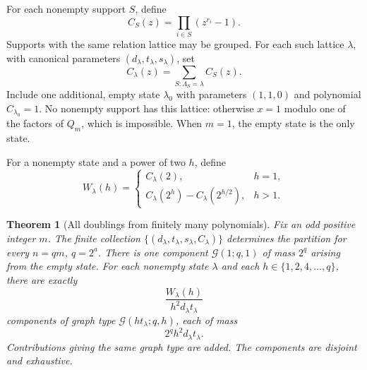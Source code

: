 \documentclass[11pt]{article}
\newtheorem{theorem}{Theorem}[section]
\theoremstyle{definition}
\theoremstyle{remark}
\numberwithin{equation}{section}
\newcommand{\G}{\mathcal G}
\begin{document}
For each nonempty support $S$, define
\begin{equation}\label{eq:support-polynomial}
 C_S(z)=\prod_{i\in S}(z^{r_i}-1).
\end{equation}
Supports with the same relation lattice may be grouped. For each such
lattice $\lambda$, with canonical parameters $(d_\lambda,t_\lambda,
s_\lambda)$, set
\begin{equation}\label{eq:lattice-polynomial}
 C_\lambda(z)=\sum_{S:\Lambda_S=\lambda} C_S(z).
\end{equation}
Include one additional, empty state $\lambda_0$ with parameters $(1,1,0)$
and polynomial $C_{\lambda_0}=1$. No nonempty support has this lattice:
otherwise $x=1$ modulo one of the factors of $Q_m$, which is impossible.
When $m=1$, the empty state is the only state.

For a nonempty state and a power of two $h$, define
\begin{equation}\label{eq:weight}
 W_\lambda(h)=
 \begin{cases}
 C_\lambda(2),&h=1,\\
 C_\lambda(2^h)-C_\lambda(2^{h/2}),&h>1.
 \end{cases}
\end{equation}

\begin{theorem}[All doublings from finitely many polynomials]\label{thm:tower}
Fix an odd positive integer $m$. The finite collection
$\{(d_\lambda,t_\lambda,s_\lambda,C_\lambda)\}$ determines the partition
for every $n=qm$, $q=2^a$. There is one component $\G(1;q,1)$ of mass
$2^q$ arising from the empty state. For each nonempty state $\lambda$ and
each $h\in\{1,2,4,\ldots,q\}$, there are exactly
\begin{equation}\label{eq:tower-multiplicity}
 \frac{W_\lambda(h)}{h^2d_\lambda t_\lambda}
\end{equation}
components of graph type $\G(ht_\lambda;q,h)$, each of mass
\begin{equation}\label{eq:tower-mass}
 2^q h^2d_\lambda t_\lambda.
\end{equation}
Contributions giving the same graph type are added. The components are
disjoint and exhaustive.
\end{theorem}
\end{document}
